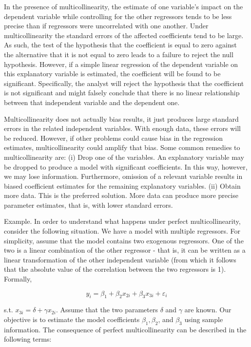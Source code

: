 In the presence of multicollinearity, the estimate of one variable's impact on the dependent variable while controlling for the other regressors tends to be less precise than if regressors were uncorrelated with one another. Under multicollinearity the standard errors of the affected coefficients tend to be large. As such, the test of the hypothesis that the coefficient is equal to zero against\\
the alternative that it is not equal to zero leads to a failure to reject the null hypothesis. However, if a simple linear regression of the dependent variable on this explanatory variable is estimated, the coefficient will be found to be significant. Specifically, the analyst will reject the hypothesis that the coefficient is not significant and might falsely conclude that there is no linear relationship between that independent variable and the dependent one.

Multicollinearity does not actually bias results, it just produces large standard errors in the related independent variables. With enough data, these errors will be reduced. However, if other problems could cause bias in the regression estimates, multicollinearity could amplify that bias. Some common remedies to multicollinearity are: (i) Drop one of the variables. An explanatory variable may be dropped to produce a model with significant coefficients. In this way, however, we may lose information. Furthermore, omission of a relevant variable results in biased coefficient estimates for the remaining explanatory variables. (ii) Obtain more data. This is the preferred solution. More data can produce more precise parameter estimates, that is, with lower standard errors.

Example. In order to understand what happens under perfect multicollinearity, consider the following situation. We have a model with multiple regressors. For simplicity, assume that the model contains two exogenous regressors. One of the two is a linear combination of the other regressor - that is, it can be written as a linear transformation of the other independent variable (from which it follows that the absolute value of the correlation between the two regressors is 1). Formally,

$$
y_{i}=\beta_{1}+\beta_{2} x_{2 i}+\beta_{3} x_{3 i}+\varepsilon_{i}
$$

s.t. $x_{3 i}=\delta+\gamma x_{2 i}$. Assume that the two parameters $\delta$ and $\gamma$ are known. Our objective is to estimate the model coefficients $\beta_{1}, \beta_{2}$, and $\beta_{3}$ using sample information. The consequence of perfect multicollinearity can be described in the following terms:

